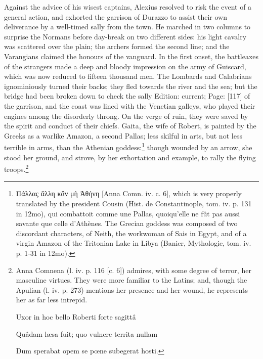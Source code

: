 Against the advice of his wisest captains, Alexius resolved to risk the event of a general action, and exhorted the garrison of Durazzo to assist their own deliverance by a well-timed sally from the town. He marched in two columns to surprise the Normans before day-break on two different sides: his light cavalry was scattered over the plain; the archers formed the second line; and the Varangians claimed the honours of the vanguard. In the first onset, the battleaxes of the strangers made a deep and bloody impression on the army of Guiscard, which was now reduced to fifteen thousand men. The Lombards and Calabrians ignominiously turned their backs; they fled towards the river and the sea; but the bridge had been broken down to check the sally Edition: current; Page: [117] of the garrison, and the coast was lined with the Venetian galleys, who played their engines among the disorderly throng. On the verge of ruin, they were saved by the spirit and conduct of their chiefs. Gaita, the wife of Robert, is painted by the Greeks as a warlike Amazon, a second Pallas; less skilful in arts, but not less terrible in arms, than the Athenian goddess:\footnote{\textgreek{Πάλλας \texthebrew{ἄ}λλη κ\texthebrew{ἂ}ν μ\texthebrew{ὴ Ἀ}θήνη} [Anna Comn. iv. c. 6], which is very properly translated by the president Cousin (Hist. de Constantinople, tom. iv. p. 131 in 12mo), qui combattoit comme une Pallas, quoiqu\texthebrew{}’elle ne fût pas aussi savante que celle d\texthebrew{}’Athènes. The Grecian goddess was composed of two discordant characters, of Neith, the workwoman of Sais in Egypt, and of a virgin Amazon of the Tritonian Lake in Libya (Banier, Mythologie, tom. iv. p. 1-31 in 12mo).} though wounded by an arrow, she stood her ground, and strove, by her exhortation and example, to rally the flying troops.\footnote{Anna Comnena (l. iv. p. 116 [c. 6]) admires, with some degree of terror, her masculine virtues. They were more familiar to the Latins; and, though the Apulian (l. iv. p. 273) mentions her presence and her wound, he represents her as far less intrepid.

Uxor in hoc bello Roberti forte sagittâ

Quâdam læsa fuit; quo vulnere territa nullam

Dum sperabat opem se pœne subegerat hosti.

}
